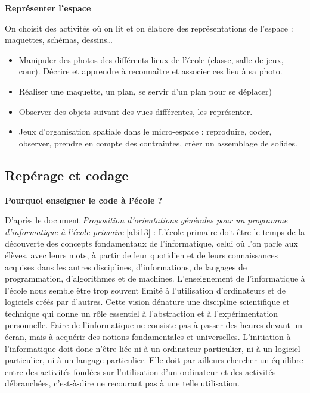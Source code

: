 \medskip

{\bf\large Représenter l'espace}

On choisit des activités où on lit et on élabore des représentations de l’espace : maquettes, schémas, dessins\dots

{\renewcommand{\StringDOCUMENTATION}{Exemples de situations}
\begin{documentation}
   \begin{itemize}
      \item Manipuler des photos des différents lieux de l'école (classe, salle de jeux, cour). Décrire et apprendre à reconnaître et associer ces lieu à sa photo.
      \item  Réaliser une maquette, un plan, se servir d'un plan pour se déplacer)
      \item Observer des objets suivant des vues différentes, les représenter.
      \item Jeux d'organisation spatiale dans le micro-espace : reproduire, coder, observer, prendre en compte des contraintes, créer un assemblage de solides. \\ [-7mm]
   \end{itemize}
\end{documentation}}

\smallskip

\pagebreak


\subsection{Repérage et codage} %

\smallskip

{\bf\large Pourquoi enseigner le code à l'école ?}

D'après le document {\it Proposition d'orientations générales pour un programme d'informatique à l'école primaire} [abi13] : \og L'école primaire doit être le temps de la découverte des concepts fondamentaux de l'informatique, celui où l'on parle aux élèves, avec leurs mots, à partir de leur quotidien et de leurs connaissances acquises dans les autres disciplines, d'informations, de langages de programmation, d'algorithmes et de machines. L'enseignement de l'informatique à l'école nous semble être trop souvent limité à l'utilisation d'ordinateurs et de logiciels créés par d'autres. Cette vision dénature une discipline scientifique et technique qui donne un rôle essentiel à l'abstraction et à l'expérimentation personnelle. Faire de l'informatique ne consiste pas à passer des heures devant un écran, mais à acquérir des notions fondamentales et universelles. L'initiation à l'informatique doit donc n'être liée ni à un ordinateur particulier, ni à un logiciel particulier, ni à un langage particulier. Elle doit par ailleurs chercher un équilibre entre des activités fondées sur l'utilisation d'un ordinateur et des activités débranchées, c'est-à-dire ne recourant pas à une telle utilisation. \fg \\
 
